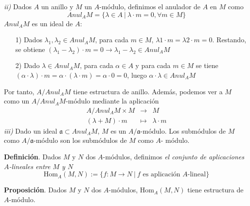 \documentclass[a4paper,12pt]{article}
\newcommand{\Hom}{\text{Hom}}
\begin{document}
\textit{ii)} Dados $A$ un anillo y $M$ un $A$-módulo, definimos el anulador de $A$ en $M$ como$$Anul_A M = \{\lambda\in A\ |\  \lambda\cdot m=0, \forall m\in M\}$$
$Anul_A M$ es un ideal de $A$: 
\begin{itemize}
     \item[1)]Dados $\lambda_1, \lambda_2\in Anul_A M$, para cada $m\in M$, $\lambda1\cdot m=\lambda2\cdot m=0$. Restando, se obtiene $(\lambda_1-\lambda_2)\cdot m=0 \rightarrow \lambda_1 -\lambda_2\in Anul_A M$
     \item[2)]Dado $\lambda\in Anul_AM$, para cada $\alpha\in A$ y para cada $m\in M$ se tiene $(\alpha\cdot\lambda)\cdot m=\alpha\cdot(\lambda\cdot m) =\alpha\cdot 0=0$, luego $\alpha\cdot\lambda\in Anul_AM$
\end{itemize}
Por tanto, $A/Anul_AM$ tiene estructura de anillo. Además, podemos ver a $M$ como un $A/Anul_AM$-módulo mediante la aplicación
$$\begin{array}{rcl}
    A/Anul_AM\times M&\longrightarrow&M\\
    (\lambda + M)\cdot m&\longmapsto&\lambda\cdot m
\end{array}$$
\textit{iii)} Dado un ideal $\mathfrak{a}\subset Anul_AM$, $M$ es un $A/\mathfrak{a}$-módulo. Los submódulos de $M$ como $A/\mathfrak{a}$-módulo son los submódulos de $M$ como $A$- módulo.

\textbf{Definición}. Dados $M$ y $N$ dos $A$-módulos, definimos \textit{el conjunto de aplicaciones $A$-lineales entre $M$ y $N$}
$$\Hom_A(M,N):=\{f:M\longrightarrow N\ |\ f\text{ es aplicación }A\text{-lineal}\}
$$

\textbf{Proposición}. Dados $M$ y $N$ dos $A$-módulos, $\Hom_A(M,N)$ tiene estructura de $A$-módulo.
\end{document}
